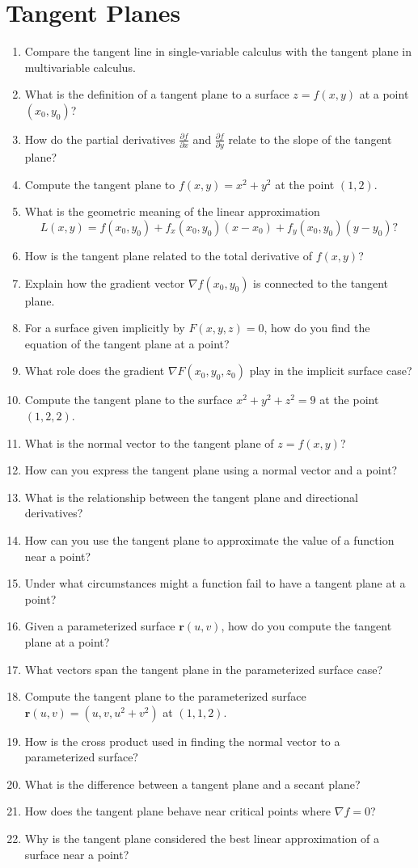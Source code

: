 \section{Tangent Planes}
\begin{enumerate}
  \item Compare the tangent line in single-variable calculus with the tangent plane in multivariable calculus.
  \item What is the definition of a tangent plane to a surface $z = f(x,y)$ at a point $(x_0, y_0)$?
  \item How do the partial derivatives $\frac{\partial f}{\partial x}$ and $\frac{\partial f}{\partial y}$ relate to the slope of the tangent plane?
  \item Compute the tangent plane to $f(x,y) = x^2 + y^2$ at the point $(1,2)$.
  \item What is the geometric meaning of the linear approximation
    \[
      L(x,y) = f(x_0,y_0) + f_x(x_0,y_0)(x - x_0) + f_y(x_0,y_0)(y - y_0)?
    \]
  \item How is the tangent plane related to the total derivative of $f(x,y)$?
  \item Explain how the gradient vector $\nabla f(x_0,y_0)$ is connected to the tangent plane.
  \item For a surface given implicitly by $F(x,y,z)=0$, how do you find the equation of the tangent plane at a point?
  \item What role does the gradient $\nabla F(x_0,y_0,z_0)$ play in the implicit surface case?
  \item Compute the tangent plane to the surface $x^2 + y^2 + z^2 = 9$ at the point $(1,2,2)$.
  \item What is the normal vector to the tangent plane of $z = f(x,y)$?
  \item How can you express the tangent plane using a normal vector and a point?
  \item What is the relationship between the tangent plane and directional derivatives?
  \item How can you use the tangent plane to approximate the value of a function near a point?
  \item Under what circumstances might a function fail to have a tangent plane at a point?
  \item Given a parameterized surface $\mathbf{r}(u,v)$, how do you compute the tangent plane at a point?
  \item What vectors span the tangent plane in the parameterized surface case?
  \item Compute the tangent plane to the parameterized surface $\mathbf{r}(u,v) = (u, v, u^2 + v^2)$ at $(1,1,2)$.
  \item How is the cross product used in finding the normal vector to a parameterized surface?
  \item What is the difference between a tangent plane and a secant plane?
  \item How does the tangent plane behave near critical points where $\nabla f = 0$?
  \item Why is the tangent plane considered the best linear approximation of a surface near a point?
\end{enumerate}
